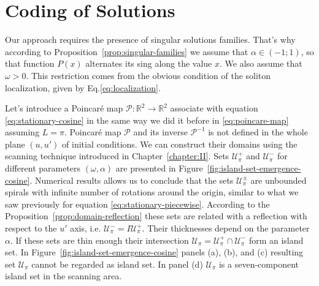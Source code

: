 \section{Coding of Solutions}

Our approach requires the presence of singular solutions families.
That's why according to Proposition~\ref{prop:singular-families} we assume that $\alpha \in (-1; 1)$, so that function $P(x)$ alternates its sing along the value $x$.
We also assume that $\omega > 0$.
This restriction comes from the obvious condition of the soliton localization, given by Eq.\eqref{eq:localization}.

Let's introduce a Poincar\'e map $\mathcal{P}: \mathbb{R}^2 \to \mathbb{R}^2$ associate with equation \eqref{eq:stationary-cosine} in the same way we did it before in \eqref{eq:poincare-map} assuming $L = \pi$.
Poincar\'e map $\mathcal{P}$ and its inverse $\mathcal{P}^{-1}$ is not defined in the whole plane $(u, u')$ of initial conditions.
We can construct their domains using the scanning technique introduced in Chapter~\ref{chapter:II}.
Sets $\mathscr{U}_{\pi}^+$ and $\mathscr{U}_{\pi}^-$ for different parameters $(\omega, \alpha)$ are presented in Figure~\ref{fig:island-set-emergence-cosine}.
Numerical results allows us to conclude that the sets $\mathscr{U}_{\pi}^{\pm}$ are unbounded spirals with infinite number of rotations around the origin, similar to what we saw previously for equation \eqref{eq:stationary-piecewise}.
According to the Proposition~\ref{prop:domain-reflection} these sets are related with a reflection with respect to the $u'$ axis, i.e. $\mathscr{U}_{\pi}^- = I \mathscr{U}_{\pi}^+$.
Their thicknesses depend on the parameter $\alpha$.
If these sets are thin enough their intersection $\mathscr{U}_{\pi} = \mathscr{U}_{\pi}^+ \cap \mathscr{U}_{\pi}^-$ form an island set.
In Figure~\ref{fig:island-set-emergence-cosine} panels (a), (b), and (c) resulting set $\mathscr{U}_{\pi}$ cannot be regarded as island set.
In panel (d) $\mathscr{U}_{\pi}$ is a seven-component island set in the scanning area.

